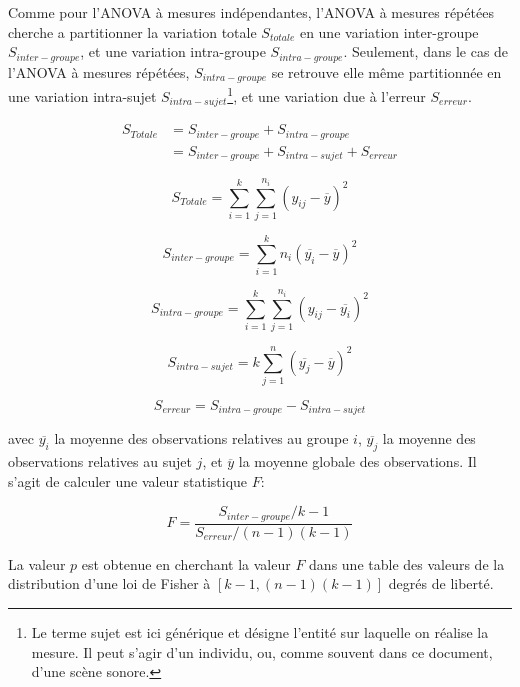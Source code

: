 Comme pour l'ANOVA à mesures indépendantes, l'ANOVA à mesures répétées cherche a partitionner la variation totale $S_{totale}$ en une variation inter-groupe $S_{inter-groupe}$, et une variation intra-groupe $S_{intra-groupe}$. Seulement, dans le cas de l'ANOVA à mesures répétées, $S_{intra-groupe}$ se retrouve elle même partitionnée en une variation intra-sujet $S_{intra-sujet}$\footnote{Le terme sujet est ici générique et désigne l'entité sur laquelle on réalise la mesure. Il peut s'agir d'un individu, ou, comme souvent dans ce document, d'une scène sonore.}, et une variation due à l'erreur $S_{erreur}$.

\begin{align}
S_{Totale} &= S_{inter-groupe} + S_{intra-groupe} \\
           &= S_{inter-groupe} + S_{intra-sujet} + S_{erreur}
\end{align}

\begin{equation}
S_{Totale}=\sum_{i=1}^k \sum_{j=1}^{n_i} (y_{ij}-\overline{y})^2
\end{equation}

\begin{equation}
S_{inter-groupe}=\sum_{i=1}^k n_i(\overline{y_i} - \overline{y})^2 
\end{equation}

\begin{equation}
S_{intra-groupe}=\sum_{i=1}^k \sum_{j=1}^{n_i} (y_{ij} - \overline{y_i})^2
\end{equation}

\begin{equation}
S_{intra-sujet}= k \sum_{j=1}^n (\overline{y_j} - \overline{y})^2 
\end{equation}

\begin{equation}
S_{erreur}= S_{intra-groupe} - S_{intra-sujet}
\end{equation}

avec $\overline{y_i}$ la moyenne des observations relatives au groupe $i$, $\overline{y_j}$ la moyenne des observations relatives au sujet $j$, et $\overline{y}$ la moyenne globale des observations. Il s'agit de calculer une valeur statistique $F$:

\begin{equation}
F=\dfrac{S_{inter-groupe}/k-1}{S_{erreur}/(n-1)(k-1)}
\end{equation}

La valeur $p$ est obtenue en cherchant la valeur $F$ dans une table des valeurs de la distribution d'une loi de Fisher à  $[k-1,(n-1)(k-1)]$ degrés de liberté.

